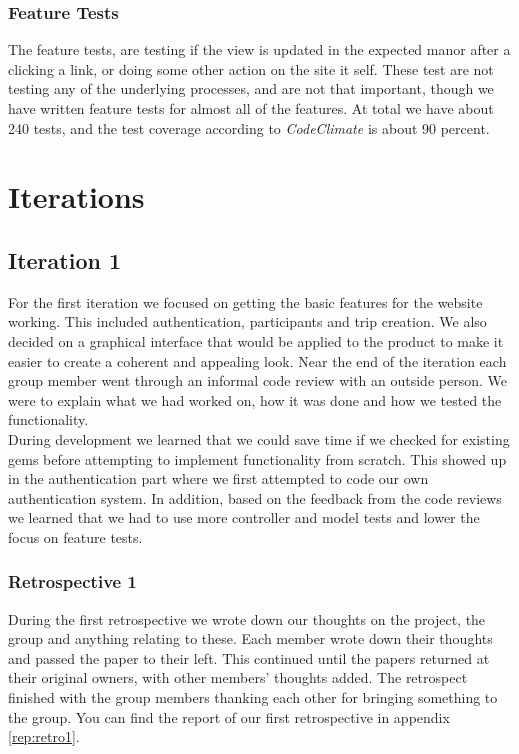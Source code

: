 \documentclass[a4paper]{article}
\begin{document}
\subsubsection{Feature Tests}
The feature tests, are testing if the view is updated in the expected manor after a clicking a link, or doing some other action on the site it self. These test are not testing any of the underlying processes, and are not that important, though we have written feature tests for almost all of the features. 
At total we have about 240 tests, and the test coverage according to \textit{CodeClimate} is about 90 percent. \\

\section{Iterations}
\subsection{Iteration 1}
For the first iteration we focused on getting the basic features for the website working. This included authentication, participants and trip creation. We also decided on a graphical interface that would be applied to the product to make it easier to create a coherent and appealing look. Near the end of the iteration each group member went through an informal code review with an outside person. We were to explain what we had worked on, how it was done and how we tested the functionality.\\

\noindent
During development we learned that we could save time if we checked for existing gems before attempting to implement functionality from scratch. This showed up in the authentication part where we first attempted to code our own authentication system. In addition, based on the feedback from the code reviews we learned that we had to use more controller and model tests and lower the focus on feature tests.

\subsubsection{Retrospective 1}
During the first retrospective we wrote down our thoughts on the project, the group and anything relating to these. Each member wrote down their thoughts and passed the paper to their left. This continued until the papers returned at their original owners, with other members' thoughts added. The retrospect finished with the group members thanking each other for bringing something to the group. You can find the report of our first retrospective in appendix \ref{rep:retro1}.
\end{document}
